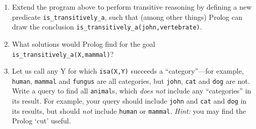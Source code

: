 \documentclass{article}
\begin{document}
\begin{enumerate}
\item
Extend the program above to perform transitive reasoning by defining a
new predicate \verb!is_transitively_a!, such that (among other things)
Prolog can draw the conclusion
\verb!is_transitively_a(john,vertebrate)!.

\item
What solutions would Prolog find for the goal
\verb!is_transitively_a(X,mammal)!?

\item
Let us call any Y for which \verb!isa(X,Y)! succeeds a
``category''---for example, \verb!human!, \verb!mammal! and
\verb!fungus! are all categories, but \verb!john!, \verb!cat! and
\verb!dog! are not.  Write a query to find all \verb!animal!s, which
     {\em does not} include any ``categories'' in its result. For
     example, your query should include \verb!john! and \verb!cat! and
     \verb!dog! in its results, but should {\em not} include
     \verb!human! or \verb!mammal!.
{\em Hint:} you may find the Prolog `cut' useful.
\end{enumerate}
\end{document}
